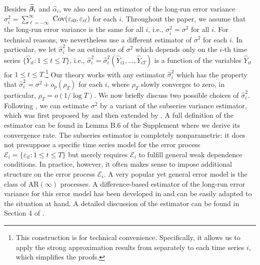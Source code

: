 \documentclass[12pt]{article}
\begin{document}
Besides $\widehat{\bm{\beta}}_i$ and $\widehat{\alpha}_i$, we also need an estimator of the long-run error variance $\sigma_i^2 = \sum\nolimits_{\ell=-\infty}^{\infty}$ $\textnormal{Cov}(\varepsilon_{i0}, \varepsilon_{i\ell})$ for each $i$. Throughout the paper, we assume that the long-run error variance is the same for all $i$, i.e., $\sigma_i^2 = \sigma^2$ for all $i$.  For technical reasons, we nevertheless use a different estimator of $\sigma^2$ for each $i$. In particular, we let $\widehat{\sigma}_i^2$ be an estimator of $\sigma^2$ which depends only on the $i$-th time series $\{ \widehat{Y}_{it}: 1 \le t \le T \}$, i.e., $\widehat{\sigma}_i^2 = \widehat{\sigma}_i^2(\widehat{Y}_{i1},\ldots,\widehat{Y}_{iT})$ is a function of the variables $\widehat{Y}_{it}$ for $1 \le t \le T$.\footnote{This construction is for technical convenience. Specifically, it allows us to apply the strong approximation results from \cite{BerkesLiuWu2014} separately to each time series $i$, which simplifies the proofs.} Our theory works with any estimator $\widehat{\sigma}_i^2$ which has the property that $\widehat{\sigma}_i^2 = \sigma^2 + o_p(\rho_T)$ for each $i$, where $\rho_T$ slowly converges to zero, in particular, $\rho_T = o(1/\log T)$. We now briefly discuss two possible choices of $\widehat{\sigma}_i^2$. Following \cite{Kim2016}, we can estimate $\sigma^2$ by a variant of the subseries variance estimator, which was first proposed by \cite{Carlstein1986} and then extended by \cite{WuZhao2007}. A full definition of the estimator can be found in Lemma B.6 %
of the Supplement where we derive its convergence rate. 
The subseries estimator is completely nonparametric: it does not presuppose a specific time series model for the error process $\mathcal{E}_i = \{ \varepsilon_{it}: 1 \le t \le T\}$ but merely requires $\mathcal{E}_i$ to fulfill general weak dependence conditions. In practice, however, it often makes sense to impose additional structure on the error process $\mathcal{E}_i$. A very popular yet general error model is the class of $\text{AR}(\infty)$ processes. A difference-based estimator of the long-run error variance for this error model has been developed in \cite{KhismatullinaVogt2020} and can be easily adapted to the situation at hand. A detailed discussion of the estimator can be found in Section 4 of \cite{KhismatullinaVogt2020}. 
\end{document}
